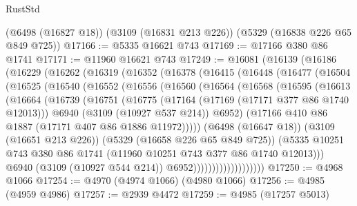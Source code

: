 \begin{lexlean}{RustStd}
\begin{coremodule}
    (@6498 (@16827 @18))
    (@3109 (@16831 @213 @226))
    (@5329 (@16838 @226 @65 @849 @725))
@17166 := @5335 @16621 @743
@17169 := @17166 @380 @86 @1741
@17171 := @11960 @16621 @743
@17249 := @16081
    (@16139
      (@16186
        (@16229
          (@16262
            (@16319
              (@16352
                (@16378
                  (@16415
                    (@16448
                      (@16477
                        (@16504
                          (@16525
                            (@16540
                              (@16552
                                (@16556
                                  (@16560
                                    (@16564
                                      (@16568
                                        (@16595
                                          (@16613
                                            (@16664
                                              (@16739
                                                (@16751
                                                  (@16775
                                                    (@17164 (@17169 (@17171 @377 @86 @1740 @12013)))
                                                    @6940
                                                    (@3109 (@10927 @537 @214))
                                                    @6952)
                                                  (@17166
                                                    @410
                                                    @86
                                                    @1887
                                                    (@17171 @407 @86 @1886 @11972)))))
                                            (@6498 (@16647 @18))
                                            (@3109 (@16651 @213 @226))
                                            (@5329 (@16658 @226 @65 @849 @725))
                                            (@5335
                                              @10251
                                              @743
                                              @380
                                              @86
                                              @1741
                                              (@11960 @10251 @743 @377 @86 @1740 @12013)))
                                          @6940
                                          (@3109 (@10927 @544 @214))
                                          @6952)))))))))))))))))))
@17250 := @4968 @1066
@17254 := @4970 (@4974 @1066) (@4980 @1066)
@17256 := @4985 (@4959 @4986)
@17257 := @2939 @4472
@17259 := @4985 (@17257 @5013)

\end{coremodule}
\end{lexlean}
